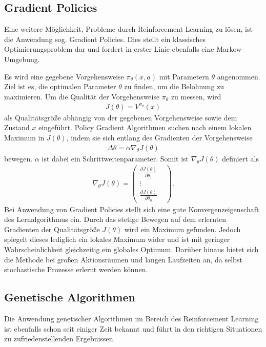 	\subsection{Gradient Policies}
		Eine weitere Möglichkeit, Probleme durch Reinforcement Learning zu lösen, ist die Anwendung sog. \glqq Gradient Policies\grqq{}. Dies stellt ein klassisches Optimierungsproblem dar und fordert in erster Linie ebenfalls eine Markow-Umgebung.
		
		Es wird eine gegebene Vorgehensweise $\pi_\theta(x,a)$ mit Parametern $\theta$ angenommen. Ziel ist es, die optimalen Parameter $\theta$ zu finden, um die Belohnung zu maximieren. Um die Qualität der Vorgehensweise $\pi_\theta$ zu messen, wird
		\begin{align}
			J(\theta) = V^{\pi_\theta}(x)
		\end{align}
		als Qualitätsgröße abhängig von der gegebenen Vorgehensweise sowie dem Zustand $x$ eingeführt. Policy Gradient Algorithmen suchen nach einem lokalen Maximum in $J(\theta)$, indem sie sich entlang des Gradienten der Vorgehensweise 
		\begin{align}
			\Delta \theta = \alpha \nabla_\theta J(\theta)
		\end{align}
		bewegen. $\alpha$ ist dabei ein Schrittweitenparameter.	Somit ist $\nabla_\theta J(\theta)$ definiert als
		\begin{align}
			\nabla_\theta J(\theta) = \begin{pmatrix}
			\frac{\partial J(\theta)}{\partial \theta_1} & \\
			\vdots & \\
			\frac{\partial J(\theta)}{\partial \theta_n} & \end{pmatrix}.
		\end{align}
		Bei Anwendung von Gradient Policies stellt sich eine gute Konvergenzeigenschaft des Lernalgorithmus ein. Durch das stetige Bewegen auf dem erlernten Gradienten der Qualitätsgröße $J(\theta)$ wird ein Maximum gefunden. Jedoch spiegelt dieses lediglich ein lokales Maximum wider und ist mit geringer Wahrscheinlichkeit gleichzeitig ein globales Optimum. Darüber hinaus bietet sich die Methode bei großen Aktionsräumen und langen Laufzeiten an, da selbst stochastische Prozesse erlernt werden können. \cite{SilverRL} 
	\subsection{Genetische Algorithmen}
	\label{subsec:gen_alg}
		Die Anwendung genetischer Algorithmen im Bereich des Reinforcement Learning ist ebenfalls schon seit einiger Zeit bekannt und führt in den richtigen Situationen zu zufriedenstellenden Ergebnissen.
		
